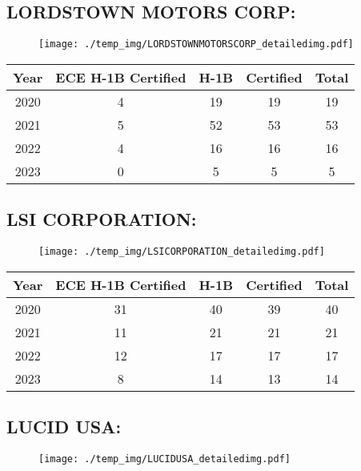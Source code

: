 \documentclass{article}%
\begin{document}
%
\newpage%
\subsection{LORDSTOWN MOTORS CORP:}%
\label{subsec:LORDSTOWNMOTORSCORP}%
\label{LORDSTOWNMOTORSCORPdetailed}%


\begin{figure}[htbp]%
\centering%
\texttt{[image: ./temp\_img/LORDSTOWNMOTORSCORP\_detailedimg.pdf]}%
\end{figure}

%
\begin{longtable}{c|c|c|c|c}%
\hline%
Year&ECE H{-}1B Certified&H{-}1B&Certified&Total\\%
\hline%
2020&4&19&19&19\\%
\hline%
2021&5&52&53&53\\%
\hline%
2022&4&16&16&16\\%
\hline%
2023&0&5&5&5\\%
\hline%
\end{longtable}

%
\newpage%
\subsection{LSI CORPORATION:}%
\label{subsec:LSICORPORATION}%
\label{LSICORPORATIONdetailed}%


\begin{figure}[htbp]%
\centering%
\texttt{[image: ./temp\_img/LSICORPORATION\_detailedimg.pdf]}%
\end{figure}

%
\begin{longtable}{c|c|c|c|c}%
\hline%
Year&ECE H{-}1B Certified&H{-}1B&Certified&Total\\%
\hline%
2020&31&40&39&40\\%
\hline%
2021&11&21&21&21\\%
\hline%
2022&12&17&17&17\\%
\hline%
2023&8&14&13&14\\%
\hline%
\end{longtable}

%
\newpage%
\subsection{LUCID USA:}%
\label{subsec:LUCIDUSA}%
\label{LUCIDUSAdetailed}%


\begin{figure}[htbp]%
\centering%
\texttt{[image: ./temp\_img/LUCIDUSA\_detailedimg.pdf]}%
\end{figure}
\end{document}
